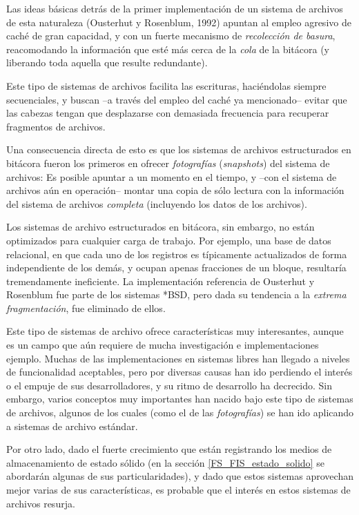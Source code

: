\documentclass[11pt,fleqn]{book} %
\begin{document}
Las ideas básicas detrás de la primer implementación de un sistema de
archivos de esta naturaleza (Ousterhut y Rosenblum, 1992) apuntan al
empleo agresivo de caché de gran capacidad, y con un fuerte mecanismo
de \emph{recolección de basura}, reacomodando la información que esté más
cerca de la \emph{cola} de la bitácora (y liberando toda aquella que
resulte redundante).

Este tipo de sistemas de archivos facilita las escrituras,
haciéndolas siempre secuenciales, y buscan –a través del empleo del
caché ya mencionado– evitar que las cabezas tengan que desplazarse
con demasiada frecuencia para recuperar fragmentos de archivos.

Una consecuencia directa de esto es que los sistemas de archivos
estructurados en bitácora fueron los primeros en ofrecer \emph{fotografías}
(\emph{snapshots}) del sistema de archivos: Es posible apuntar a un
momento en el tiempo, y –con el sistema de archivos aún en operación–
montar una copia de sólo lectura con la información del sistema de
archivos \emph{completa} (incluyendo los datos de los archivos).

Los sistemas de archivo estructurados en bitácora, sin embargo, no
están optimizados para cualquier carga de trabajo. Por ejemplo, una
base de datos relacional, en que cada uno de los registros es
típicamente actualizados de forma independiente de los demás, y ocupan
apenas fracciones de un bloque, resultaría tremendamente
ineficiente. La implementación referencia de Ousterhut y Rosenblum fue
parte de los sistemas *BSD, pero dada su tendencia a la \emph{extrema fragmentación}, fue eliminado de ellos.

Este tipo de sistemas de archivo ofrece características muy
interesantes, aunque es un campo que aún requiere de mucha
investigación e implementaciones ejemplo. Muchas de las
implementaciones en sistemas libres han llegado a niveles de
funcionalidad aceptables, pero por diversas causas han ido perdiendo
el interés o el empuje de sus desarrolladores, y su ritmo de
desarrollo ha decrecido. Sin embargo, varios conceptos muy
importantes han nacido bajo este tipo de sistemas de archivos,
algunos de los cuales (como el de las \emph{fotografías}) se han ido
aplicando a sistemas de archivo estándar.

Por otro lado, dado el fuerte crecimiento que están registrando los
medios de almacenamiento de estado sólido (en la sección
\ref{FS_FIS_estado_solido} se abordarán algunas de sus
particularidades), y dado que estos sistemas aprovechan mejor varias
de sus características, es probable que el interés en estos sistemas
de archivos resurja.
\end{document}
